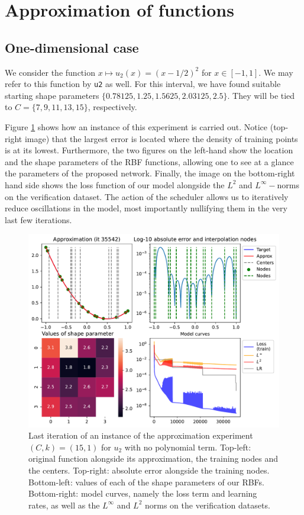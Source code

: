 \documentclass[12pt]{report} %
\begin{document}
\section{Approximation of functions}



\subsection*{One-dimensional case}

We consider the function $x \mapsto u_2(x)=(x-1/2)^2$ for $x \in [-1,1]$. We may refer to this function by \texttt{u2} as well. For this interval, we have found suitable starting shape parameters $\{0.78125, 1.25, 1.5625, 2.03125, 2.5\}$. They will be tied to $C=\{7,9,11,13,15\}$, respectively.

Figure \ref{u2-example-training-TR15-C15} shows how an instance of this experiment is carried out. Notice (top-right image) that the largest error is located where the density of training points is at its lowest. Furthermore, the two figures on the left-hand show the location and the shape parameters of the RBF functions, allowing one to see at a glance the parameters of the proposed network. Finally, the image on the bottom-right hand side shows the loss function of our model alongside the $L^2$ and $L^\infty-$norms on the verification dataset. The action of the scheduler allows us to iteratively reduce oscillations in the model, most importantly nullifying them in the very last few iterations.

\begin{figure}[h]
  \includegraphics[width=\textwidth]{imagenes/experiments/1d/statistical_1d_full_scheduler_interpolation/u2-TR15-C15-Kgaussian_kernel-Sh2.5-6-E35542.pdf}
  \caption{Last iteration of an instance of the approximation experiment $(C,k)=(15,1)$ for $u_2$ with no polynomial term. Top-left: original function alongside its approximation, the training nodes and the centers. Top-right: absolute error alongside the training nodes. Bottom-left: values of each of the shape parameters of our RBFs. Bottom-right: model curves, namely the loss term and learning rates, as well as the $L^\infty$ and $L^2$ norms on the verification datasets.}
  \label{u2-example-training-TR15-C15}
\end{figure}
\end{document}
